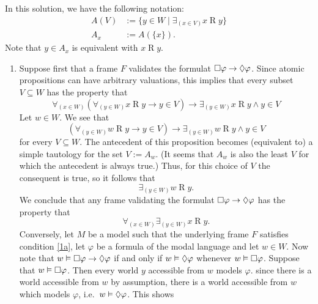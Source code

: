 \documentclass{article}
\begin{document}
\maketitle

\begin{ex}
In this solution, we have the following notation:
\begin{align*}
A(V) & := \{y\in W\mid \exists_{(x\in V)} x\mathbin{R}y\}\\
A_x & := A(\{x\}).
\end{align*}
Note that $y\in A_x$ is equivalent with $x\mathbin{R} y$. 
\begin{enumerate}
\item Suppose first that a frame $F$ validates the formulat $\square\varphi\to\lozenge\varphi$.
Since atomic propositions can have arbitrary valuations, this implies that every
subset $V\subseteq W$ has the property that 
\begin{equation*}
\forall_{(x\in W)}(\forall_{(y\in W)} x\mathbin{R}y\to y\in V)\to\exists_{(y\in W)} x\mathbin{R}y\land y\in V
\end{equation*}
Let $w\in W$. We see that
\begin{equation*}
(\forall_{(y\in W)} w\mathbin{R}y\to y\in V)\to\exists_{(y\in W)} w\mathbin{R}y\land y\in V
\end{equation*}
for every $V\subseteq W$. The antecedent of this proposition becomes (equivalent to) a simple
tautology for the set $V:= A_w$. (It seems that $A_w$ is also the least $V$ for which
the antecedent is always true.) Thus, for this choice of $V$ the consequent is true,
so it follows that
\begin{equation*}
\exists_{(y\in W)} w\mathbin{R}y.
\end{equation*}
We conclude that any frame validating the formulat $\square\varphi\to\lozenge\varphi$
has the property that
\begin{equation}\label{1a}
\forall_{(x\in W)}\exists_{(y\in W)}x\mathbin{R}y.
\end{equation}
Conversely, let $M$ be a model such that the underlying frame $F$ satisfies
condition \ref{1a}, let $\varphi$ be a formula of the modal language and let
$w\in W$. Now note that $w\vDash\square\varphi\to\lozenge\varphi$ if and only if
$w\vDash\lozenge\varphi$ whenever $w\vDash\square\varphi$. Suppose that
$w\vDash\square\varphi$. Then every world $y$ accessible from $w$ models $\varphi$.
since there is a world accessible from $w$ by assumption, there is a world
accessible from $w$ which models $\varphi$, i.e.~$w\vDash\lozenge\varphi$. This shows

\end{enumerate}
\end{ex}
\end{document}
